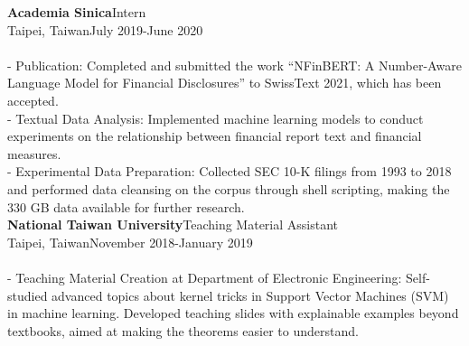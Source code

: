 \documentclass{article}
\begin{document}
\noindent\textbf{Academia Sinica}\hfill Intern\\
Taipei, Taiwan\hfill July 2019-June 2020\\\\
- Publication: Completed and submitted the work ``NFinBERT: A Number-Aware Language Model for Financial Disclosures'' to SwissText 2021, which has been accepted.\\ - Textual Data Analysis: Implemented machine learning models to conduct experiments on the relationship between financial report text and financial measures.\\ - Experimental Data Preparation: Collected SEC 10-K filings from 1993 to 2018 and performed data cleansing on the corpus through shell scripting, making the 330 GB data available for further research.\\

\noindent\textbf{National Taiwan University}\hfill Teaching Material Assistant\\
Taipei, Taiwan\hfill November 2018-January 2019\\\\
- Teaching Material Creation at Department of Electronic Engineering: Self-studied advanced topics about kernel tricks in Support Vector Machines (SVM) in machine learning. Developed teaching slides with explainable examples beyond textbooks, aimed at making the theorems easier to understand.\\




\setlength{\leftmargini}{0em}
\end{document}
